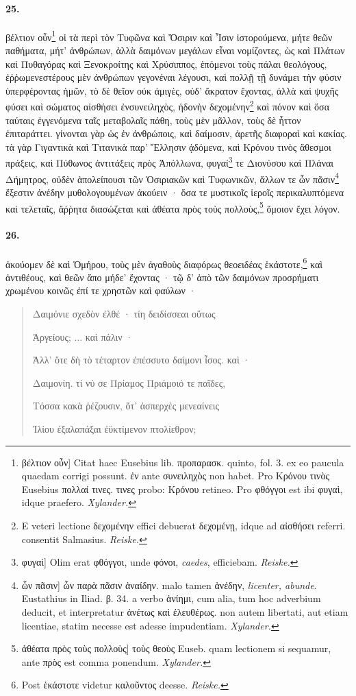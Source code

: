 \documentclass[a4paper, 11pt, oneside, polutonikogreek, german, landscape]{article}
\begin{document}
\paragraph{25.}
βέλτιον οὖν\footnote{βέλτιον οὖν] Citat haec Eusebius lib. προπαρασκ. quinto, fol. 3. ex eo paucula quaedam corrigi possunt. ἐν ante συνειληχὸς non habet. Pro Κρόνου τινὸς Eusebius πολλαί τινες. τινες probo: Κρόνου retineo. Pro φθόγγοι est ibi φυγαὶ, idque praefero. \emph{Xylander.}} οἱ τὰ περὶ τὸν Τυφῶνα καὶ Ὄσιριν καὶ Ἶσιν ἱστορούμενα, μήτε θεῶν παθήματα, μήτ' ἀνθρώπων, ἀλλὰ δαιμόνων μεγάλων εἶναι νομίζοντες, ὡς καὶ Πλάτων καὶ Πυθαγόρας καὶ Ξενοκροίτης καὶ Χρύσιππος, ἑπόμενοι τοὺς πάλαι θεολόγους, ἐῤῥωμενεστέρους μὲν ἀνθρώπων γεγονέναι λέγουσι, καὶ πολλῇ τῇ δυνάμει τὴν φύσιν ὑπερφέροντας ἡμῶν, τὸ δὲ θεῖον οὐκ ἀμιγὲς, οὐδ' ἄκρατον ἔχοντας, ἀλλὰ καὶ ψυχῆς φύσει καὶ σώματος αἰσθήσει ἐνσυνειληχὸς, ἡδονὴν δεχομένην\footnote{E veteri lectione δεχομένην effici debuerat δεχομένῃ, idque ad αἰσθήσει referri. consentit Salmasius. \emph{Reiske.}} καὶ πόνον καὶ ὅσα ταύταις ἐγγενόμενα ταῖς μεταβολαῖς πάθη, τοὺς μὲν μᾶλλον, τοὺς δὲ ἧττον ἐπιταράττει. γίνονται γὰρ ὡς ἐν ἀνθρώποις, καὶ δαίμοσιν, ἀρετῆς διαφοραὶ καὶ κακίας. τὰ γὰρ Γιγαντικὰ καὶ Τιτανικὰ παρ' Ἕλλησιν ᾀδόμενα, καὶ Κρόνου τινὸς ἄθεσμοι πράξεις, καὶ Πύθωνος ἀντιτάξεις πρὸς Ἀπόλλωνα, φυγαί\footnote{φυγαὶ] Olim erat φθόγγοι, unde φόνοι, \emph{caedes}, efficiebam. \emph{Reiske.}} τε Διονύσου καὶ Πλάναι Δήμητρος, οὐδὲν ἀπολείπουσι τῶν Ὀσιριακῶν καὶ Τυφωνικῶν, ἄλλων τε ὧν πᾶσιν\footnote{ὧν πᾶσιν] ὧν παρὰ πᾶσιν ἀναίδην. malo tamen ἀνέδην, \emph{licenter, abunde}. Eustathius in Iliad. β. 34. a verbo ἀνίημι, cum alia, tum hoc adverbium deducit, et interpretatur ἀνέτως καὶ ἐλευθέρως. non autem libertati, aut etiam licentiae, statim necesse est adesse impudentiam. \emph{Xylander.}} ἔξεστιν ἀνέδην μυθολογουμένων ἀκούειν · ὅσα τε μυστικοῖς ἱεροῖς περικαλυπτόμενα καὶ τελεταῖς, ἄῤῥητα διασώζεται καὶ ἀθέατα πρὸς τοὺς πολλοὺς,\footnote{ἀθέατα πρὸς τοὺς πολλοὺς] τοὺς θεοὺς Euseb. quam lectionem si sequamur, ante πρὸς est comma ponendum. \emph{Xylander.}} ὅμοιον ἔχει λόγον.

\paragraph{26.}
ἀκούομεν δὲ καὶ Ὁμήρου, τοὺς μὲν ἀγαθοὺς διαφόρως θεοειδέας ἑκάστοτε,\footnote{Post ἑκάστοτε videtur καλοῦντος deesse. \emph{Reiske.}} καὶ ἀντιθέους, καὶ θεῶν ἄπο μήδε' ἔχοντας · τῷ δ' ἀπὸ τῶν δαιμόνων προσρήματι χρωμένου κοινῶς ἐπί τε χρηστῶν καὶ φαύλων ·
\begin{quotation}\small
Δαιμόνιε σχεδὸν ἐλθέ · τίη δειδίσσεαι οὕτως

Ἀργείους; ... καὶ πάλιν ·

Ἀλλ' ὅτε δὴ τὸ τέταρτον ἐπέσσυτο δαίμονι ἶσος. καὶ ·

Δαιμονίη. τί νύ σε Πρίαμος Πριάμοιό τε παῖδες,

Τόσσα κακὰ ῥέζουσιν, ὅτ' ἀσπερχὲς μενεαίνεις

Ἰλίου ἐξαλαπάξαι ἐϋκτίμενον πτολίεθρον;
\end{quotation}
\end{document}
